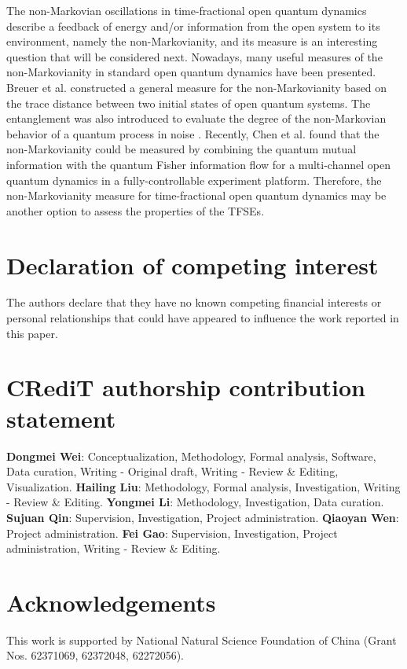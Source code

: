 \documentclass[
showpacs,  %
showkeys,  %
aps,       %
amsthm,    %
amsmath,   %
amsfonts,  %
amssymb    %
]{revtex4-1}          %
\begin{document}
The non-Markovian oscillations in time-fractional open quantum dynamics describe a feedback of energy and/or information from the open system to its environment, namely the non-Markovianity, and its measure is an interesting question that will be considered next. Nowadays, many useful measures of the non-Markovianity in standard open quantum dynamics have been presented. Breuer et al. \cite{Breuer2009} constructed a general measure for the non-Markovianity based on the trace distance between two initial states of open quantum systems. The entanglement was also introduced to evaluate the degree of the non-Markovian behavior of a quantum process in noise \cite{Rivas2010,Addis2016}. Recently, Chen et al. \cite{Chen2022} found that the non-Markovianity could be measured by combining the quantum mutual information with the quantum Fisher information flow for a multi-channel open quantum dynamics in a fully-controllable experiment platform. Therefore, the non-Markovianity measure for time-fractional open quantum dynamics may be another option to assess the properties of the TFSEs.

\section*{Declaration of competing interest}
The authors declare that they have no known competing financial interests or personal relationships that could have appeared to influence the work reported in this paper.

\section*{CRediT authorship contribution statement}
\textbf{Dongmei Wei}: Conceptualization, Methodology, Formal analysis, Software, Data curation, Writing - Original draft, Writing - Review \& Editing, Visualization. \textbf{Hailing Liu}: Methodology, Formal analysis, Investigation, Writing - Review \& Editing. \textbf{Yongmei Li}: Methodology, Investigation, Data curation. \textbf{Sujuan Qin}: Supervision, Investigation, Project administration. \textbf{Qiaoyan Wen}: Project administration. \textbf{Fei Gao}: Supervision, Investigation, Project administration, Writing - Review \& Editing.

\section*{Acknowledgements}
This work is supported by National Natural Science Foundation of China (Grant Nos. 62371069, 62372048, 62272056).
\end{document}
